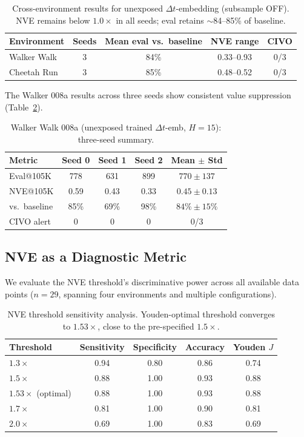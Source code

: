 \documentclass[10pt,letterpaper]{article}
\newcommand{\dt}{\Delta t}
\begin{document}
\begin{table}[h]
\centering
\caption{Cross-environment results for unexposed $\dt$-embedding (subsample OFF). NVE remains below $1.0\times$ in all seeds; eval retains $\sim$84--85\% of baseline.}
\label{tab:unexposed_crossenv}
\begin{tabular}{lcccc}
\toprule
\textbf{Environment} & \textbf{Seeds} & \textbf{Mean eval vs.\ baseline} & \textbf{NVE range} & \textbf{CIVO} \\
\midrule
Walker Walk  & 3 & 84\% & 0.33--0.93 & 0/3 \\
Cheetah Run  & 3 & 85\% & 0.48--0.52 & 0/3 \\
\bottomrule
\end{tabular}
\end{table}

The Walker 008a results across three seeds show consistent value suppression (Table~\ref{tab:008a_seeds}).

\begin{table}[h]
\centering
\caption{Walker Walk 008a (unexposed trained $\dt$-emb, $H=15$): three-seed summary.}
\label{tab:008a_seeds}
\begin{tabular}{lcccc}
\toprule
\textbf{Metric} & \textbf{Seed 0} & \textbf{Seed 1} & \textbf{Seed 2} & \textbf{Mean $\pm$ Std} \\
\midrule
Eval@105K     & 778 & 631 & 899 & $770 \pm 137$ \\
NVE@105K      & 0.59 & 0.43 & 0.33 & $0.45 \pm 0.13$ \\
vs.\ baseline & 85\% & 69\% & 98\% & $84\% \pm 15\%$ \\
CIVO alert    & 0   & 0   & 0   & 0/3 \\
\bottomrule
\end{tabular}
\end{table}

\subsection{NVE as a Diagnostic Metric}
\label{sec:nve}

We evaluate the NVE threshold's discriminative power across all available data points ($n = 29$, spanning four environments and multiple configurations).

\begin{table}[h]
\centering
\caption{NVE threshold sensitivity analysis. Youden-optimal threshold converges to $1.53\times$, close to the pre-specified $1.5\times$.}
\label{tab:nve_roc}
\begin{tabular}{lcccc}
\toprule
\textbf{Threshold} & \textbf{Sensitivity} & \textbf{Specificity} & \textbf{Accuracy} & \textbf{Youden $J$} \\
\midrule
$1.3\times$ & 0.94 & 0.80 & 0.86 & 0.74 \\
$1.5\times$ & 0.88 & 1.00 & 0.93 & 0.88 \\
$1.53\times$ (optimal) & 0.88 & 1.00 & 0.93 & 0.88 \\
$1.7\times$ & 0.81 & 1.00 & 0.90 & 0.81 \\
$2.0\times$ & 0.69 & 1.00 & 0.83 & 0.69 \\
\bottomrule
\end{tabular}
\end{table}
\end{document}
